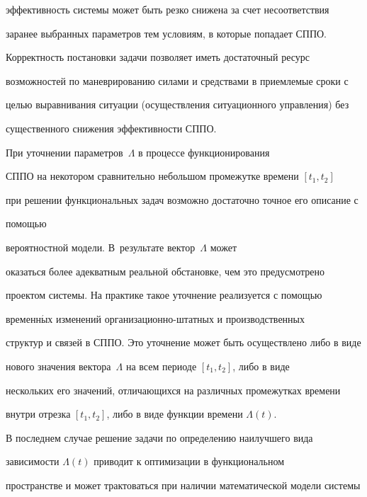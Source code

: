 эффективность системы может быть резко снижена за счет несоответствия

заранее выбранных параметров тем условиям, в которые попадает СППО.

Корректность постановки задачи позволяет иметь достаточный ресурс

возможностей по маневрированию силами и средствами в приемлемые сроки с

целью выравнивания ситуации (осуществления ситуационного управления) без

существенного снижения эффективности СППО.



     При уточнении параметров~$\Lambda$ в процессе функционирования

СППО на некотором сравнительно небольшом промежутке времени $[t_1,t_2]$

при решении функциональных задач возможно достаточно точное его описание с

помощью\linebreak\vspace*{-12pt}



\pagebreak



\noindent

 вероятностной модели. В~результате вектор~$\Lambda$ может

оказаться более адекватным реальной обстановке, чем это предусмотрено

проектом системы. На практике такое уточнение реализуется с помощью

временн$\acute{\mbox{ы}}$х изменений ор\-га\-ни\-за\-ци\-он\-но-штат\-ных и производственных

структур и связей в СППО. Это уточнение может быть осуществлено либо в виде

нового значения вектора~$\Lambda$ на всем периоде $[t_1,t_2]$, либо в виде

нескольких его значений, отличающихся на различных промежутках времени

внутри отрезка $[t_1,t_2]$, либо в виде функции времени $\Lambda(t)$.



     В последнем случае решение задачи по определению наилучшего вида

зависимости $\Lambda(t)$ приводит к оптимизации в функциональном

пространстве и может трактоваться при наличии математической модели системы

